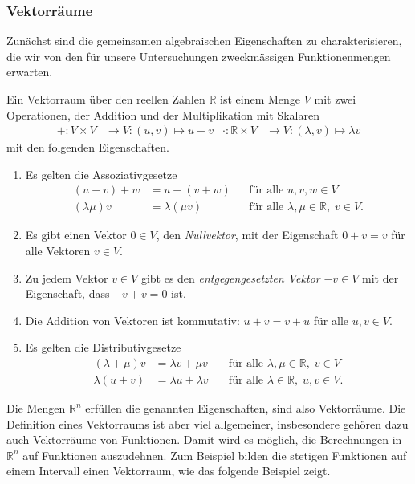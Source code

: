 %
%
\subsubsection{Vektorräume}
Zunächst sind die gemeinsamen algebraischen Eigenschaften zu charakterisieren,
die wir von den für unsere Untersuchungen zweckmässigen Funktionenmengen
erwarten.

\begin{definition}[Vektorraum]
%
Ein Vektorraum über den reellen Zahlen $\mathbb{R}$ ist einem Menge $V$ mit
zwei Operationen, der Addition und der Multiplikation mit Skalaren
\begin{align*}
    +\colon V\times V         &\to V : (u,v)\mapsto u+v
&
\cdot\colon \mathbb{R}\times V&\to V : (\lambda,v) \mapsto\lambda v
\end{align*}
mit den folgenden Eigenschaften.
\begin{enumerate}
\item
Es gelten die Assoziativgesetze
%
\begin{align*}
(u+v)+w&=u+(v+w)&&\text{für alle $u,v,w\in V$}\\
(\lambda \mu)v&=\lambda(\mu v)&&\text{für alle $\lambda,\mu\in\mathbb{R},\;v\in V$.}
\end{align*}
\item
Es gibt einen Vektor $0\in V$, den {\em Nullvektor}, mit der Eigenschaft
$0+v=v$ für alle Vektoren $v\in V$.
%
\item
Zu jedem Vektor $v\in V$ gibt es den {\em entgegengesetzten Vektor}
$-v\in V$ mit der Eigenschaft, dass $-v+v=0$ ist.
%
\item
Die Addition von Vektoren ist kommutativ: $u+v=v+u$ für alle $u,v\in V$.
%
\item
Es gelten die Distributivgesetze 
\begin{align*}
(\lambda + \mu) v &= \lambda v + \mu v
	&\quad\text{für alle $\lambda,\mu\in\mathbb{R},\;v\in V$}\\
\lambda(u+v)      &= \lambda u + \lambda v
	&\quad\text{für alle $\lambda\in\mathbb{R},\;u,v\in V$.}
\end{align*}
%
\end{enumerate}
\end{definition}

Die Mengen $\mathbb{R}^n$ erfüllen die genannten Eigenschaften, sind
also Vektorräume.
Die Definition eines Vektorraums ist aber viel allgemeiner, insbesondere
gehören dazu auch Vektorräume von Funktionen.
Damit wird es möglich, die Berechnungen in $\mathbb{R}^n$ auf Funktionen
auszudehnen.
Zum Beispiel bilden die stetigen Funktionen auf einem Intervall einen
Vektorraum, wie das folgende Beispiel zeigt.

